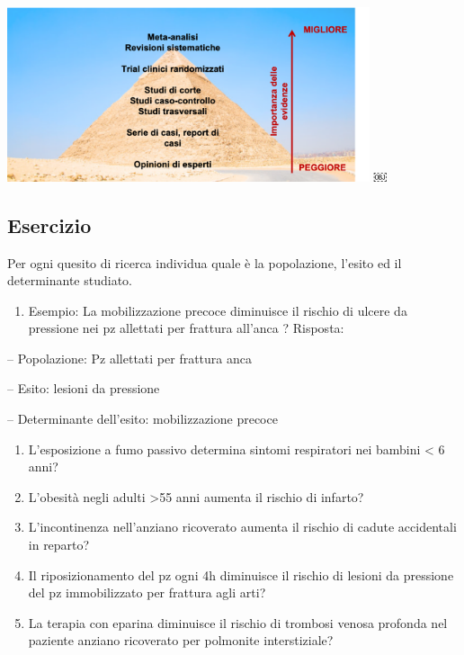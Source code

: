 \documentclass[]{book}
\providecommand{\tightlist}{%
  \setlength{\itemsep}{0pt}\setlength{\parskip}{0pt}}
\begin{document}
\includegraphics[width=0.8\textwidth,height=\textheight]{./img/piramide.png}
￼

\hypertarget{esercizio-1}{%
\subsection{Esercizio}\label{esercizio-1}}

Per ogni quesito di ricerca individua quale è la popolazione, l'esito ed il determinante studiato.

\begin{enumerate}
\def\labelenumi{\arabic{enumi}.}
\tightlist
\item
  Esempio: La mobilizzazione precoce diminuisce il rischio di ulcere da pressione nei pz allettati per frattura all'anca ? Risposta:
\end{enumerate}

-- Popolazione: Pz allettati per frattura anca

-- Esito: lesioni da pressione

-- Determinante dell'esito: mobilizzazione precoce

\begin{enumerate}
\def\labelenumi{\arabic{enumi}.}
\setcounter{enumi}{1}
\item
  L'esposizione a fumo passivo determina sintomi respiratori nei bambini \textless{} 6 anni?
\item
  L'obesità negli adulti \textgreater{}55 anni aumenta il rischio di infarto?
\item
  L'incontinenza nell'anziano ricoverato aumenta il rischio di cadute accidentali in reparto?
\item
  Il riposizionamento del pz ogni 4h diminuisce il rischio di lesioni da pressione del pz immobilizzato per frattura agli arti?
\item
  La terapia con eparina diminuisce il rischio di trombosi venosa profonda nel paziente anziano ricoverato per polmonite interstiziale?
\end{enumerate}
\end{document}
